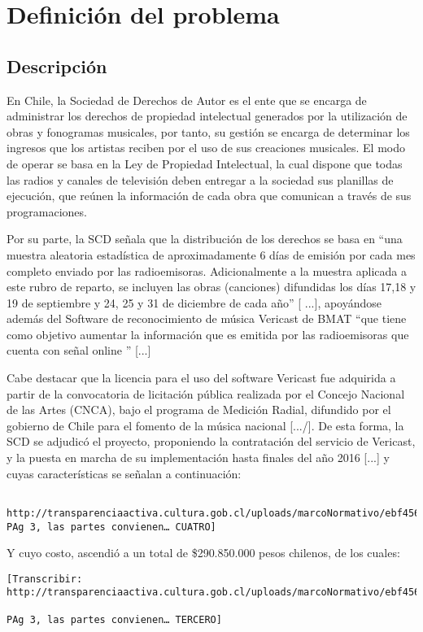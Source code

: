 
\chapter{Definición del problema}

\section{Descripción}

En Chile, la Sociedad de Derechos de Autor es el ente que se encarga de administrar los derechos de propiedad intelectual generados por la utilización de obras y fonogramas musicales, por tanto, su gestión se encarga de determinar los ingresos que los artistas reciben por el uso de sus creaciones musicales. 
El modo de operar se basa en la Ley de Propiedad Intelectual, la cual dispone que todas las radios y canales de televisión deben entregar a la sociedad sus planillas de ejecución, que reúnen la información de cada obra que comunican a través de sus programaciones. 

\bigskip

Por su parte, la SCD señala que la distribución de los derechos se basa en “una muestra aleatoria estadística de aproximadamente 6 días de emisión por cada mes completo enviado por las radioemisoras. Adicionalmente a la muestra aplicada a este rubro de reparto, se incluyen las obras (canciones) difundidas los días 17,18 y 19 de septiembre y 24, 25 y 31 de diciembre de cada año” [ ...], apoyándose además del Software de reconocimiento de música Vericast de BMAT “que tiene como objetivo aumentar la información que es emitida por las radioemisoras que cuenta con señal online ” [...]

\bigskip

Cabe destacar que la licencia para el uso del software Vericast fue adquirida a partir de la convocatoria de licitación pública realizada por el Concejo Nacional de las Artes (CNCA), bajo el programa de Medición Radial, difundido por el gobierno de Chile para el fomento de la música nacional [.../]. De esta forma, la SCD se adjudicó el proyecto, proponiendo la contratación del servicio de Vericast, y la puesta en marcha de su implementación hasta finales del año 2016 [...] y cuyas características se señalan a continuación:


\begin{verbatim}

http://transparenciaactiva.cultura.gob.cl/uploads/marcoNormativo/ebf456ab89212ce3af3173b8f2ebd18c5fc3a123.pdf
PAg 3, las partes convienen… CUATRO]
\end{verbatim}
Y cuyo costo, ascendió a un total de \$290.850.000 pesos chilenos, de los cuales:
\begin{verbatim}[Transcribir: http://transparenciaactiva.cultura.gob.cl/uploads/marcoNormativo/ebf456ab89212ce3af3173b8f2ebd18c5fc3a123.pdf

PAg 3, las partes convienen… TERCERO]
\end{verbatim}


